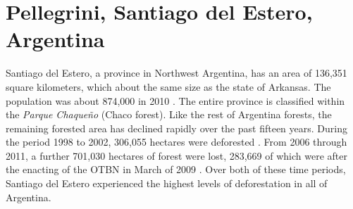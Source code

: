 \section{Pellegrini, Santiago del Estero, Argentina}
\label{studyareas:pellegrini}

Santiago del Estero, a province in Northwest Argentina, has an area of 136,351 square kilometers, which about the same size as the state of Arkansas. The population was about 874,000 in 2010 \autocite{estadistica-y-c2010a}. The entire province is classified within the \textit{Parque Chaqueño} (Chaco forest). Like the rest of Argentina forests, the remaining forested area has declined rapidly over the past fifteen years. During the period 1998 to 2002, 306,055 hectares were deforested \autocite{secretaria-de-a2007informe}. From 2006 through 2011, a further 701,030 hectares of forest were lost, 283,669 of which were after the enacting of the OTBN in March of 2009 \autocite{secreteria-de-a2012monitoreo}. Over both of these time periods, Santiago del Estero experienced the highest levels of deforestation in all of Argentina.

